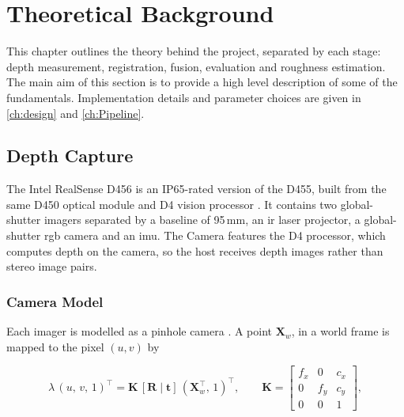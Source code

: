 \chapter{Theoretical Background}
\label{ch:theory}


This chapter outlines the theory behind the project, separated by each stage: depth measurement, registration, fusion, evaluation and roughness estimation. The main aim of this section is to provide a high level description of some of the fundamentals. Implementation details and parameter choices are given in \autoref{ch:design} and \autoref{ch:Pipeline}.

\section{Depth Capture}
\label{sec:theory_depth}
The Intel RealSense D456 is an IP65-rated version of the D455, built from the same D450 optical module and D4 vision processor \cite{intel_d456}. It contains two global-shutter imagers separated by a baseline of 95\,mm, an \gls{ir} laser projector, a global-shutter \gls{rgb} camera and an \gls{imu}. The Camera features the D4 processor, which computes depth on the camera, so the host receives depth images rather than stereo image pairs.

\subsection{Camera Model}
\label{sec:theory_camera}
Each imager is modelled as a pinhole camera \cite{hartley2003multiple}. A point $\mathbf{X}_w$, in a world frame is mapped to the pixel $(u,v)$ by


\begin{equation}
\lambda\,(u,\,v,\,1)^\top = \mathbf{K}\,[\mathbf{R}\mid\mathbf{t}]\,(\mathbf{X}_w^\top,\,1)^\top,
\qquad
\mathbf{K}=\left[\begin{smallmatrix} f_x & 0 & c_x\\ 0 & f_y & c_y\\ 0 & 0 & 1\end{smallmatrix}\right],
\label{eq:pinhole}
\end{equation}

